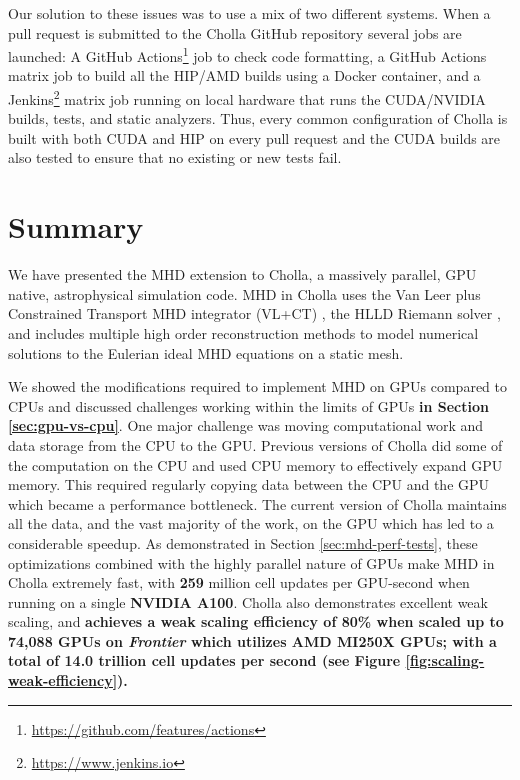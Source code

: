 \documentclass[modern, linenumbers]{aastex631}
\begin{document}
Our solution to these issues was to use a mix of two different systems. When a pull request is submitted to the Cholla GitHub repository several jobs are launched: A GitHub Actions\footnote{\url{https://github.com/features/actions}} job to check code formatting, a GitHub Actions matrix job to build all the HIP/AMD builds using a Docker container, and a Jenkins\footnote{\url{https://www.jenkins.io}} matrix job running on local hardware that runs the CUDA/NVIDIA builds, tests, and static analyzers. Thus, every common configuration of Cholla is built with both CUDA and HIP on every pull request and the CUDA builds are also tested to ensure that no existing or new tests fail.


\section{Summary}
\label{sec:summary}

We have presented the MHD extension to Cholla, a massively parallel, GPU native, astrophysical simulation code. MHD in Cholla uses the Van Leer plus Constrained Transport MHD integrator (VL+CT) \citep{stone_2009}, the HLLD Riemann solver \citep{hlld_2005}, and includes multiple high order reconstruction methods to model numerical solutions to the Eulerian ideal MHD equations on a static mesh.

We showed the modifications required to implement MHD on GPUs compared to CPUs and discussed challenges working within the limits of GPUs \textbf{in Section \ref{sec:gpu-vs-cpu}}. One major challenge was moving computational work and data storage from the CPU to the GPU. Previous versions of Cholla did some of the computation on the CPU and used CPU memory to effectively expand GPU memory. This required regularly copying data between the CPU and the GPU which became a performance bottleneck. The current version of Cholla maintains all the data, and the vast majority of the work, on the GPU which has led to a considerable speedup. As demonstrated in Section \ref{sec:mhd-perf-tests}, these optimizations combined with the highly parallel nature of GPUs make MHD in Cholla extremely fast, with \textbf{259} million cell updates per GPU-second when running on a single \textbf{NVIDIA A100}. Cholla also demonstrates excellent weak scaling, and \textbf{achieves a weak scaling efficiency of 80\% when scaled up to 74,088 GPUs on \textit{Frontier} which utilizes AMD MI250X GPUs; with a total of 14.0 trillion cell updates per second (see Figure \ref{fig:scaling-weak-efficiency}).}
\end{document}
